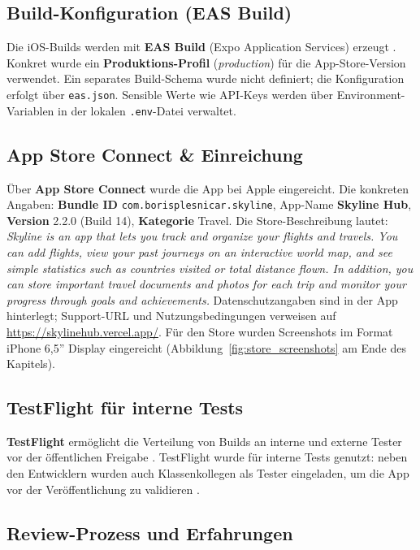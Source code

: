 \subsection{Build-Konfiguration (EAS Build)}

Die iOS-Builds werden mit \textbf{EAS Build} (Expo Application Services) erzeugt
\cite{easBuild}. Konkret wurde ein \textbf{Produktions-Profil} (\emph{production})
für die App-Store-Version verwendet. Ein separates Build-Schema wurde nicht
definiert; die Konfiguration erfolgt über \texttt{eas.json}. Sensible Werte wie
API-Keys werden über Environment-Variablen in der lokalen \texttt{.env}-Datei
verwaltet.

\subsection{App Store Connect \& Einreichung}

Über \textbf{App Store Connect} wurde die App bei Apple eingereicht. Die konkreten
Angaben: \textbf{Bundle ID} \texttt{com.borisplesnicar.skyline}, App-Name
\textbf{Skyline Hub}, \textbf{Version} 2.2.0 (Build 14), \textbf{Kategorie} Travel.
Die Store-Beschreibung lautet: \emph{Skyline is an app that lets you track and
organize your flights and travels. You can add flights, view your past journeys
on an interactive world map, and see simple statistics such as countries visited
or total distance flown. In addition, you can store important travel documents
and photos for each trip and monitor your progress through goals and achievements.}
Datenschutzangaben sind in der App hinterlegt; Support-URL und Nutzungsbedingungen
verweisen auf \url{https://skylinehub.vercel.app/}. Für den Store wurden
Screenshots im Format iPhone 6,5'' Display eingereicht (Abbildung~\ref{fig:store_screenshots} am Ende des Kapitels).

\subsection{TestFlight für interne Tests}

\textbf{TestFlight} ermöglicht die Verteilung von Builds an interne und externe
Tester vor der öffentlichen Freigabe \cite{testflight}. TestFlight wurde für
interne Tests genutzt: neben den Entwicklern wurden auch Klassenkollegen als
Tester eingeladen, um die App vor der Veröffentlichung zu validieren
\cite{ralfebertTestflight}.

\subsection{Review-Prozess und Erfahrungen}

